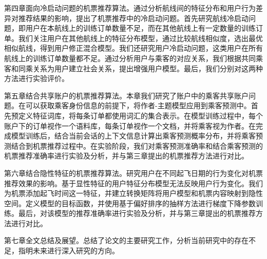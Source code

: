 第四章面向冷启动问题的机票推荐算法。通过分析航线间的特征分布和用户行为差异对推荐结果的影响，提出了机票推荐中的冷启动问题。首先研究航线冷启动问题，即用户在本航线上的训练订单数量不足，而在其他航线上有一定数量的训练订单。我们关注用户在其他航线上的特征分布模型，通过比较航线相似度，选出最优相似航线，得到用户修正混合模型。我们还研究用户冷启动问题，这类用户在所有航线上的训练订单数量都不足。通过分析用户与乘客的对应关系，我们根据共同乘客和同乘关系为用户建立社会关系，提出增强用户模型。最后，我们分别对这两种方法进行实验评价。

第五章结合共享账户的机票推荐算法。本章我们研究了账户中的乘客共享账户问题。在可以获取乘客身份信息的前提下，将作者-主题模型应用到乘客预测中。首先预定义特征词库，将每条订单都使用词汇的集合表示。在模型训练过程中，每个账户下的订单视作一个语料库，每条订单视作一个文档，并将乘客视为作者。在完成模型训练后，结合当前会话的上下文信息计算出乘客预测概率分布，并将乘客预测结合到机票推荐过程中。在实验阶段，我们对乘客预测准确率和结合乘客预测的机票推荐准确率进行实验及分析，并与第三章提出的机票推荐方法进行对比。

第六章结合隐性特征的机票推荐算法。研究用户在不同起飞日期的行为变化对机票推荐效果的影响。基于显性特征的用户特征分布模型无法反映用户行为变化。我们为机票添加起飞时间这一特征，并建立转换矩阵将用户模型和机票内容映射到隐性空间。定义模型的目标函数，并使用基于偏好排序的抽样方法进行梯度下降参数训练。最后，对该模型的推荐准确率进行实验及分析，并与第三章提出的机票推荐方法进行对比。

第七章全文总结及展望。总结了论文的主要研究工作，分析当前研究中的存在不足，指明未来进行深入研究的方向。